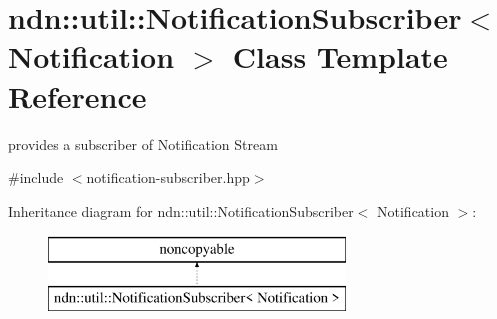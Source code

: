 \hypertarget{classndn_1_1util_1_1NotificationSubscriber}{}\section{ndn\+:\+:util\+:\+:Notification\+Subscriber$<$ Notification $>$ Class Template Reference}
\label{classndn_1_1util_1_1NotificationSubscriber}


provides a subscriber of Notification Stream  




{\ttfamily \#include $<$notification-\/subscriber.\+hpp$>$}

Inheritance diagram for ndn\+:\+:util\+:\+:Notification\+Subscriber$<$ Notification $>$\+:\begin{figure}[H]
\begin{center}
\leavevmode
\includegraphics[height=2.000000cm]{classndn_1_1util_1_1NotificationSubscriber}
\end{center}
\end{figure}
